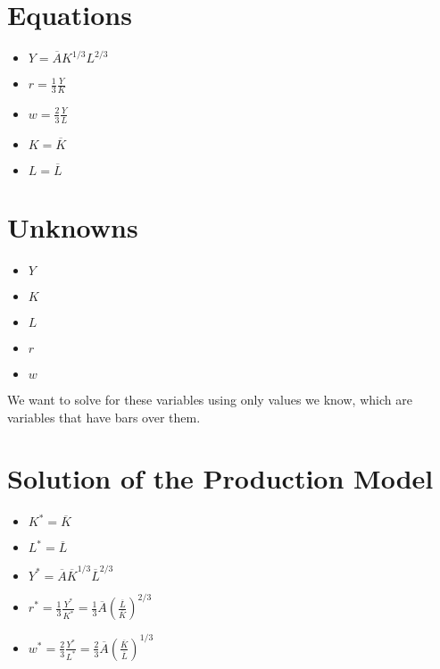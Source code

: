 \documentclass[8pt]{extarticle}
\title{}
\author{Avinash Iyer}
\date{}
\begin{document}
{
\section*{Equations}%
  \begin{itemize}
    \item $Y = \overline{A}K^{1/3}L^{2/3}$
    \item $r = \frac{1}{3}\frac{Y}{K}$
    \item $w = \frac{2}{3}\frac{Y}{L}$
    \item $K = \overline{K}$
    \item $L = \overline{L}$
  \end{itemize}
\section*{Unknowns}%
  \begin{itemize}
    \item $Y$
    \item $K$
    \item $L$
    \item $r$
    \item $w$
  \end{itemize}
We want to solve for these variables using only values we know, which are variables that have bars over them.
\section*{Solution of the Production Model}%
  \begin{itemize}
    \item $K^{*} = \overline{K}$
    \item $L^{*} = \overline{L}$
    \item $Y^{*} = \overline{A}\overline{K}^{1/3}\overline{L}^{2/3}$
    \item $r^{*} = \frac{1}{3}\frac{Y^{*}}{K^{*}} = \frac{1}{3}\overline{A}\left(\frac{\overline{L}}{\overline{K}}\right)^{2/3}$
    \item $w^{*} = \frac{2}{3}\frac{Y^{*}}{L^{*}} = \frac{2}{3}\overline{A}\left(\frac{\overline{K}}{\overline{L}}\right)^{1/3}$
  \end{itemize}
}
\end{document}
